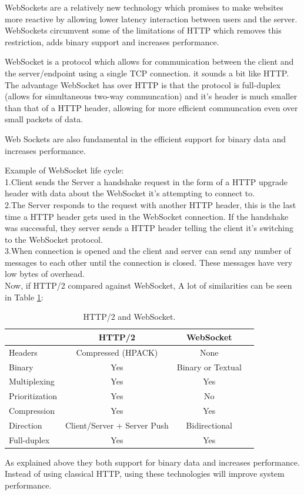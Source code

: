 WebSockets\citep{Ontology:matching} are a relatively new technology which promises to make websites more reactive by allowing lower latency interaction between users and the server. WebSockets circumvent some of the limitations of HTTP which removes this restriction, adds binary support and increases performance.

WebSocket is a protocol which allows for communication between the client and the server/endpoint using a single TCP connection. it sounds a bit like HTTP. The advantage WebSocket has over HTTP is that the protocol is full-duplex (allows for simultaneous two-way communcation) and it’s header is much smaller than that of a HTTP header, allowing for more efficient communcation even over small packets of data.

Web Sockets are also fundamental in the efficient support for binary data and increases performance.

Example of WebSocket life cycle:\citep{thesis:state7}\\
1.Client sends the Server a handshake request in the form of a HTTP upgrade header with data about the WebSocket
it’s attempting to connect to.\\
2.The Server responds to the request with another HTTP header, this is the last time a HTTP header gets used in the WebSocket connection. If the handshake was successful, they server sends a HTTP header telling the client it’s switching to the WebSocket protocol.\\
3.When connection is opened and the client and server can send any number of messages to each other
until the connection is closed. These messages have very low bytes of overhead.\\

Now, if HTTP/2 compared against WebSocket\citep{thesis:state11}, A lot of similarities can be seen in Table \ref{tab:websocket}:
\begin{table}[!htb]
  \renewcommand{\arraystretch}{1.2} %
  \centering
  \begin{tabular}{lccc}
    \toprule
                   & HTTP/2                      & WebSocket  \\
    \midrule
    Headers        & Compressed (HPACK)          & None\\
    Binary         & Yes                         & Binary or Textual\\
    Multiplexing   & Yes                         & Yes\\
    Prioritization & Yes                         & No\\
    Compression    & Yes                         & Yes\\
    Direction      & Client/Server + Server Push & Bidirectional\\
    Full-duplex    & Yes                         & Yes\\

    \bottomrule
  \end{tabular}
  \caption[HTTP/2 and WebSocket.]{HTTP/2 and WebSocket.}
  \label{tab:websocket}
\end{table}

As explained above they both support for binary data and increases performance. Instead of using classical HTTP, using these technologies will improve system performance.
